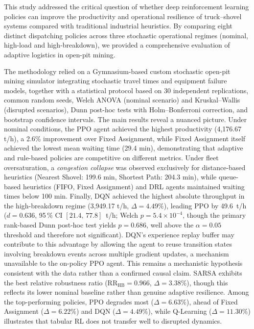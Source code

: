 \documentclass[11pt,a4paper]{article}
\begin{document}
This study addressed the critical question of whether deep reinforcement learning policies can improve the productivity and operational resilience of truck--shovel systems compared with traditional industrial heuristics. By comparing eight distinct dispatching policies across three stochastic operational regimes (nominal, high-load and high-breakdown), we provided a comprehensive evaluation of adaptive logistics in open-pit mining.

The methodology relied on a Gymnasium-based custom stochastic open-pit mining simulator integrating stochastic travel times and equipment failure models, together with a statistical protocol based on 30 independent replications, common random seeds, Welch ANOVA (nominal scenario) and Kruskal--Wallis (disrupted scenarios), Dunn post-hoc tests with Holm--Bonferroni correction, and bootstrap confidence intervals. The main results reveal a nuanced picture. Under nominal conditions, the PPO agent achieved the highest productivity (4,176.67 t/h), a 2.6\% improvement over Fixed Assignment, while Fixed Assignment itself achieved the lowest mean waiting time (29.4 min), demonstrating that adaptive and rule-based policies are competitive on different metrics. Under fleet oversaturation, a \textit{congestion collapse} was observed exclusively for distance-based heuristics (Nearest Shovel: 199.6 min, Shortest Path: 204.3 min), while queue-based heuristics (FIFO, Fixed Assignment) and DRL agents maintained waiting times below 100 min. Finally, DQN achieved the highest absolute throughput in the high-breakdown regime (3,949.17 t/h, $\Delta=4.49\%$), leading PPO by 49.6~t/h ($d=0.636$, 95\,\% CI $[21.4,\,77.8]$~t/h; Welch $p=5.4\times10^{-4}$, though the primary rank-based Dunn post-hoc test yields $p=0.686$, well above the $\alpha=0.05$ threshold and therefore not significant). DQN's experience replay buffer may contribute to this advantage by allowing the agent to reuse transition states involving breakdown events across multiple gradient updates, a mechanism unavailable to the on-policy PPO agent. This remains a mechanistic hypothesis consistent with the data rather than a confirmed causal claim. SARSA exhibits the best relative robustness ratio ($\text{RR}_{\mathrm{HB}}=0.966$, $\Delta=3.38\%$), though this reflects its lower nominal baseline rather than genuine adaptive resilience. Among the top-performing policies, PPO degrades most ($\Delta=6.63\%$), ahead of Fixed Assignment ($\Delta=6.22\%$) and DQN ($\Delta=4.49\%$), while Q-Learning ($\Delta=11.30\%$) illustrates that tabular RL does not transfer well to disrupted dynamics.
\end{document}
